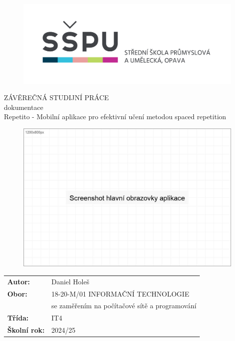\documentclass[12pt, a4paper, twoside, openright]{report}
\title{\nazevPrace} %
\author{\jmenoAutora} %
\date{\datumOdevzdani} %
\newcommand\obor{INFORMAČNÍ TECHNOLOGIE} %
\newcommand\kodOboru{18-20-M/01} %
\newcommand\zamereni{se zaměřením na počítačové sítě a programování} %
\newcommand\trida{IT4} %
\newcommand\jmenoAutora{Daniel Holeš}  %
\newcommand\skolniRok{2024/25} %
\newcommand\nazevPrace{Repetito - Mobilní aplikace pro efektivní učení metodou spaced repetition} %
\begin{document}
	
	\pagestyle{empty}
	
	\cleardoublepage

	
	{\selectfont
		\begin{figure}[h]
			\centering
			\includegraphics[width=0.6\linewidth]{image/logo-skoly.png}
		\end{figure}
		
		
		{\bfseries %
			\begin{center}
				\vspace{0.025 \textheight}
				\LARGE{ZÁVĚREČNÁ STUDIJNÍ PRÁCE}\\
				\large{dokumentace}\\
				\vspace{0.075 \textheight}
				\LARGE {\nazevPrace}\\
			\end{center}  
		}%
		
		\begin{figure}[h]
			\centering
			\includegraphics[width=0.8\linewidth]{image/screenshot-main.jpg}
			\label{fig:main-screen}
		\end{figure}
		
		\vspace{0.02 \textheight}
		\begin{table}[h!]
			\begin{tabular}{ll}
				\textbf{Autor:} & \jmenoAutora\\ 
				\textbf{Obor:} & \kodOboru { } \obor\\
				\textbf{} & \zamereni\\
				\textbf{Třída:} & \trida\\
				\textbf{Školní rok:} & \skolniRok\\
			\end{tabular}
			
		\end{table}		
	}
	
\end{document}
